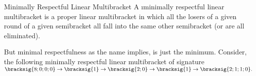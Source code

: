{    \begin{definition}{Minimally Respectful Linear Multibracket}{}
        A \i{minimally respectful} linear multibracket is a proper linear multibracket in which all the losers of a given round of a given semibracket all fall into the same other semibracket (or are all eliminated).
    \end{definition}

    But minimal respectfulness as the name implies, is just the minimum. Consider, the following minimally respectful linear multibracket of signature $\bracksig{8;0;0;0} \to \bracksig{1}\to \bracksig{2;0} \to \bracksig{1} \to \bracksig{2;1;1;0}.$







}
